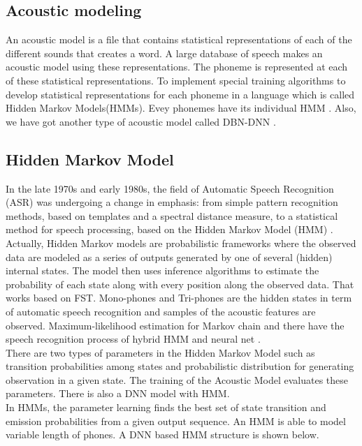 \documentclass{standalone}
\begin{document}
\subsection{Acoustic modeling}
An acoustic model is a file that contains statistical representations of each of the different sounds that creates a word. A large database of speech makes an acoustic model using these representations. The phoneme is represented at each of these statistical representations. To implement special training algorithms to develop statistical representations for each phoneme in a language which is called Hidden Markov Models(HMMs). Evey phonemes have its individual HMM \cite{boruah2013study}. Also, we have got another type of acoustic model called DBN-DNN \cite{mohamed2012acoustic, hinton2012deep}.

\subsection{Hidden Markov Model}
In the late 1970s and early 1980s, the field of Automatic Speech Recognition (ASR) was undergoing a change in emphasis: from simple pattern recognition methods, based on templates and a spectral distance measure, to a statistical method for speech processing, based on the Hidden Markov Model (HMM) \cite{rabiner1989tutorial, boruah2013study}. Actually, Hidden Markov models are probabilistic frameworks where the observed data are modeled as a series of outputs generated by one of several (hidden) internal states. The model then uses inference algorithms to estimate the probability of each state along with every position along the observed data. That works based on FST. Mono-phones and Tri-phones are the hidden states in term of automatic speech recognition and samples of the acoustic features are observed. Maximum-likelihood estimation for Markov chain and there have the speech recognition process of hybrid HMM and neural net \cite{juang1985maximum, kundu1998speech}.
\\
There are two types of parameters in the Hidden Markov Model such as transition probabilities among states and probabilistic distribution for generating observation in a given state. The training of the Acoustic Model evaluates these parameters. There is also a DNN model with HMM.\\

In HMMs, the parameter learning finds the best set of state transition and emission probabilities from a given output sequence. An HMM is able to model variable length of phones. A DNN based HMM structure is shown below.\\
\end{document}
